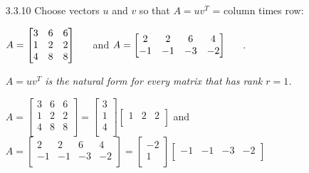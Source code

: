 \documentclass[10pt,twoside,reqno]{article}
\begin{document}
\begin{enumerate}
\item[3.3.10] Choose vectors $u$ and $v$ so that $A = uv^T$ = column times row: \\
\begin{center}
$
$$
A =
\begin{bmatrix}
3&6&6\\
1&2&2\\
4&8&8\\
\end{bmatrix}
\hspace{5mm}
$$
$
and
\hspace{5mm}
$
$$
A = 
\begin{bmatrix}
2&2&6&4\\
-1&-1&-3&-2\\
\end{bmatrix}
\hspace{5mm}
$$
$
. \\
\end{center}
\textit{$A = uv^T$ is the natural form for every matrix that has rank $r = 1$.}
\vspace{3mm}
\begin{center}
$
$$
A =
\begin{bmatrix}
3&6&6\\
1&2&2\\
4&8&8\\
\end{bmatrix}
=
\begin{bmatrix}
3\\
1\\
4\\
\end{bmatrix}
\begin{bmatrix}
1&2&2\\
\end{bmatrix}
$$
$
and
$
$$
A =
\begin{bmatrix}
2&2&6&4\\
-1&-1&-3&-2\\
\end{bmatrix}
=
\begin{bmatrix}
-2\\
1\\
\end{bmatrix}
\begin{bmatrix}
-1&-1&-3&-2\\
\end{bmatrix}
$$
$
\end{center}


\end{enumerate}
\end{document}
